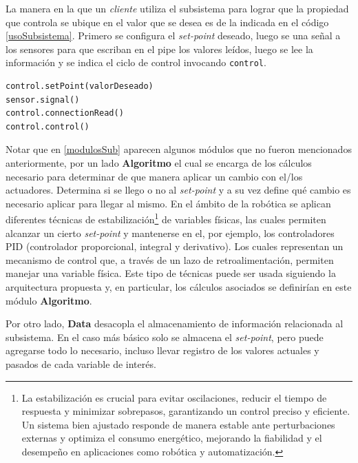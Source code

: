 La manera en la que un \textit{cliente} utiliza el subsistema para lograr que la propiedad que controla se ubique en el valor que se desea es de la indicada en el código \ref{usoSubsistema}. Primero se configura el \textit{set-point} deseado, luego se  una señal a los sensores para que escriban en el pipe los valores leídos, luego se lee la información y se indica el ciclo de control invocando \verb|control|.

\begin{lstlisting}[caption=Ejemplo de uso del subsistema.,label={usoSubsistema},style=seudocode]
control.setPoint(valorDeseado)
sensor.signal()
control.connectionRead()
control.control()
\end{lstlisting}

Notar que en \ref{modulosSub} aparecen algunos módulos que no fueron mencionados anteriormente, por un lado \textbf{Algoritmo} el cual se encarga de los cálculos necesario para determinar de que manera aplicar un cambio con el/los actuadores. Determina si se llego o no al \textit{set-point} y a su vez define qué cambio es necesario aplicar para llegar al mismo. En el ámbito de la robótica se aplican diferentes técnicas de estabilización\footnote{La estabilización es crucial para evitar oscilaciones, reducir el tiempo de respuesta y minimizar sobrepasos, garantizando un control preciso y eficiente. Un sistema bien ajustado responde de manera estable ante perturbaciones externas y optimiza el consumo energético, mejorando la fiabilidad y el desempeño en aplicaciones como robótica y automatización.} de variables físicas, las cuales permiten alcanzar un cierto \textit{set-point} y mantenerse en el, por ejemplo, los controladores \gls{PID}\cite{pidlibro} (controlador proporcional, integral y derivativo). Los cuales representan un mecanismo de control que, a través de un lazo de retroalimentación, permiten manejar una variable física. Este tipo de técnicas puede ser usada siguiendo la arquitectura propuesta y, en particular, los cálculos asociados se definirían en este módulo \textbf{Algoritmo}.

Por otro lado, \textbf{Data} desacopla el almacenamiento de información relacionada al subsistema. En el caso más básico solo se almacena el \textit{set-point}, pero puede agregarse todo lo necesario, incluso llevar registro de los valores actuales y pasados de cada variable de interés.

